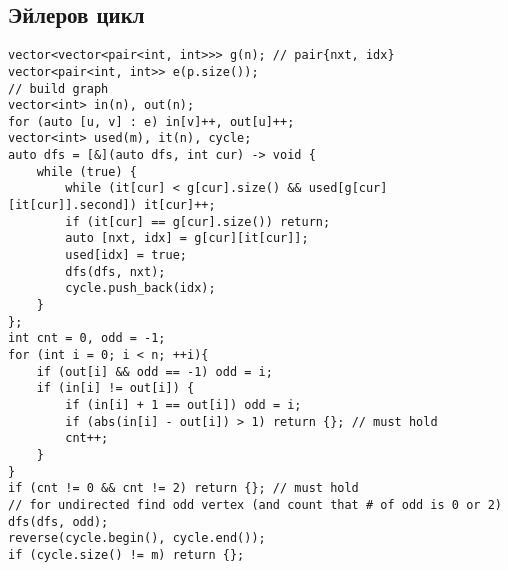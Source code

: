 \subsection{Эйлеров цикл}
\begin{lstlisting}
vector<vector<pair<int, int>>> g(n); // pair{nxt, idx}
vector<pair<int, int>> e(p.size());
// build graph
vector<int> in(n), out(n);
for (auto [u, v] : e) in[v]++, out[u]++;
vector<int> used(m), it(n), cycle;
auto dfs = [&](auto dfs, int cur) -> void {
    while (true) {
        while (it[cur] < g[cur].size() && used[g[cur][it[cur]].second]) it[cur]++;
        if (it[cur] == g[cur].size()) return;
        auto [nxt, idx] = g[cur][it[cur]];
        used[idx] = true;
        dfs(dfs, nxt);
        cycle.push_back(idx);
    }
};
int cnt = 0, odd = -1;
for (int i = 0; i < n; ++i){
    if (out[i] && odd == -1) odd = i;
    if (in[i] != out[i]) {
        if (in[i] + 1 == out[i]) odd = i;
        if (abs(in[i] - out[i]) > 1) return {}; // must hold
        cnt++;
    }
}
if (cnt != 0 && cnt != 2) return {}; // must hold
// for undirected find odd vertex (and count that # of odd is 0 or 2)
dfs(dfs, odd);
reverse(cycle.begin(), cycle.end());
if (cycle.size() != m) return {};
\end{lstlisting}
